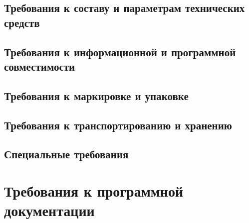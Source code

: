 \documentclass{bmstu-gost-7-32}
\begin{document}
\subsection{Требования к составу и параметрам технических средств}


\subsection{Требования к информационной и программной совместимости}


\subsection{Требования к маркировке и упаковке}


\subsection{Требования к транспортированию и хранению}


\subsection{Специальные требования}

\section{Требования к программной документации}
\end{document}
